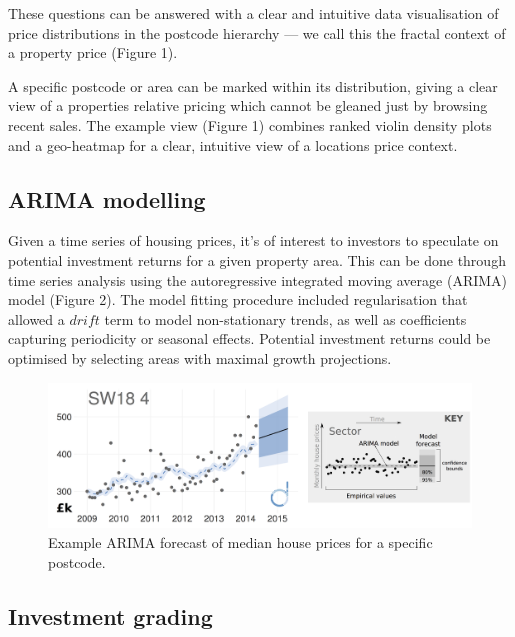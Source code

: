 \documentclass[
10pt, %
a4paper, %
oneside, %
headinclude,footinclude, %
BCOR5mm, %
]{scrartcl}
\begin{document}

These questions can be answered with a clear and intuitive data
visualisation of price distributions in the postcode hierarchy --- we
call this the fractal context of a property price (Figure 1).

A specific postcode or area can be marked within its distribution,
giving a clear view of a properties relative pricing which cannot be
gleaned just by browsing recent sales. The example view (Figure 1)
combines ranked violin density plots and a geo-heatmap for a clear,
intuitive view of a locations price context.

\subsection*{ARIMA modelling}

Given a time series of housing prices, it's of interest to investors
to speculate on potential investment returns for a given property
area. This can be done through time series analysis using the
autoregressive integrated moving average (ARIMA) model (Figure 2). The
model fitting procedure included regularisation that allowed a $drift$
term to model non-stationary trends, as well as coefficients capturing
periodicity or seasonal effects. Potential investment returns could be
optimised by selecting areas with
maximal growth projections. \\

\begin{figure}[h]
\begin{center}
\includegraphics[width=.9\textwidth]{Figures/arima.png}
\caption{Example ARIMA forecast of median house prices for a specific postcode.}
\end{center}
\end{figure}

\vspace{-1em}
\subsection*{Investment grading}
\end{document}

